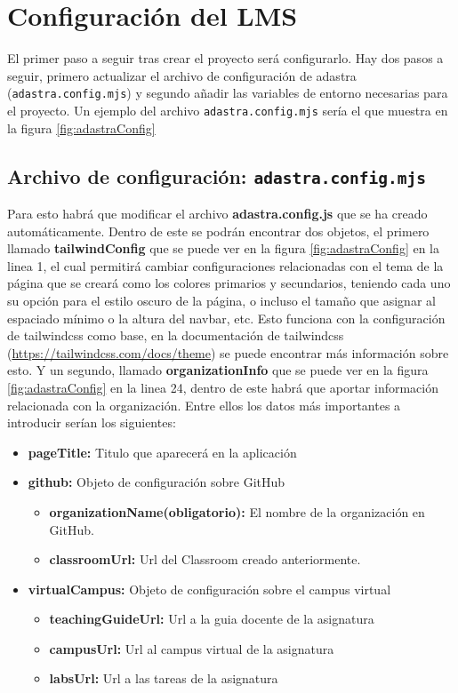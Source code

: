 \section{Configuración del LMS}
El primer paso a seguir tras crear el proyecto será configurarlo. Hay dos pasos a seguir, 
primero actualizar el archivo de configuración de adastra (\verb|adastra.config.mjs|) y segundo
añadir las variables de entorno necesarias para el proyecto. Un ejemplo del archivo \verb|adastra.config.mjs| sería el que muestra en la figura \ref{fig:adastraConfig}

\subsection{Archivo de configuración: {\tt adastra.config.mjs}}

 Para esto habrá que modificar el archivo \textbf{adastra.config.js} que se ha creado automáticamente. Dentro de este se podrán encontrar dos objetos, el primero llamado \textbf{tailwindConfig} que se puede ver en la figura \ref{fig:adastraConfig} en la linea 1, el cual permitirá cambiar configuraciones relacionadas con el tema de la página que se creará como los colores primarios y secundarios, teniendo cada uno su opción para el estilo oscuro de la página, o incluso el tamaño que asignar al espaciado mínimo o la altura del navbar, etc. Esto funciona con la configuración de tailwindcss como base, en la documentación de tailwindcss (\url{https://tailwindcss.com/docs/theme}) se puede encontrar más información sobre esto. Y un segundo, llamado \textbf{organizationInfo} que se puede ver en la figura \ref{fig:adastraConfig} en la linea 24, dentro de este habrá que aportar información relacionada con la organización. Entre ellos los datos más importantes a introducir serían los siguientes:

 \begin{itemize}
    \item \textbf{pageTitle:} Titulo que aparecerá en la aplicación
    \item \textbf{github:} Objeto de configuración sobre GitHub
        \begin{itemize}
            \item \textbf{organizationName(obligatorio):} El nombre de la organización en GitHub.
            \item \textbf{classroomUrl:} Url del Classroom creado anteriormente.
        \end{itemize}
    \item \textbf{virtualCampus:} Objeto de configuración sobre el campus virtual
        \begin{itemize}
            \item \textbf{teachingGuideUrl:} Url a la guia docente de la asignatura
            \item \textbf{campusUrl:} Url al campus virtual de la asignatura
            \item \textbf{labsUrl:} Url a las tareas de la asignatura
        \end{itemize}
\end{itemize}

